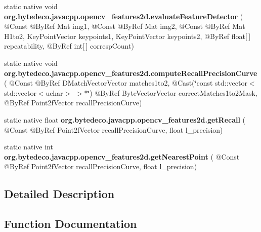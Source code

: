 \begin{DoxyCompactItemize}
\item 
\mbox{\label{group__features2d_gac9f6b29e290c3332acc345c8a01c87ce}} 
static native void {\bfseries org.\+bytedeco.\+javacpp.\+opencv\+\_\+features2d.\+evaluate\+Feature\+Detector} ( @Const @By\+Ref Mat img1, @Const @By\+Ref Mat img2, @Const @By\+Ref Mat H1to2, Key\+Point\+Vector keypoints1, Key\+Point\+Vector keypoints2, @By\+Ref float\mbox{[}$\,$\mbox{]} repeatability, @By\+Ref int\mbox{[}$\,$\mbox{]} corresp\+Count)
\item 
\mbox{\label{group__features2d_gab9c229306c2d055cfbe158fee3aa99ba}} 
static native void {\bfseries org.\+bytedeco.\+javacpp.\+opencv\+\_\+features2d.\+compute\+Recall\+Precision\+Curve} ( @Const @By\+Ref D\+Match\+Vector\+Vector matches1to2, @Cast(\char`\"{}const std\+::vector$<$std\+::vector$<$uchar$>$ $>$$\ast$\char`\"{}) @By\+Ref Byte\+Vector\+Vector correct\+Matches1to2\+Mask, @By\+Ref Point2f\+Vector recall\+Precision\+Curve)
\item 
\mbox{\label{group__features2d_gafa560a4da7ac6bd13b1b1748fb8f36cf}} 
static native float {\bfseries org.\+bytedeco.\+javacpp.\+opencv\+\_\+features2d.\+get\+Recall} ( @Const @By\+Ref Point2f\+Vector recall\+Precision\+Curve, float l\+\_\+precision)
\item 
\mbox{\label{group__features2d_gac14421ece616aca60beb57e99208b0df}} 
static native int {\bfseries org.\+bytedeco.\+javacpp.\+opencv\+\_\+features2d.\+get\+Nearest\+Point} ( @Const @By\+Ref Point2f\+Vector recall\+Precision\+Curve, float l\+\_\+precision)
\end{DoxyCompactItemize}


\subsection{Detailed Description}


\subsection{Function Documentation}
\mbox{\label{group__features2d_gaae7a705a66cbdd0ed99122fe183a0e03}} 
